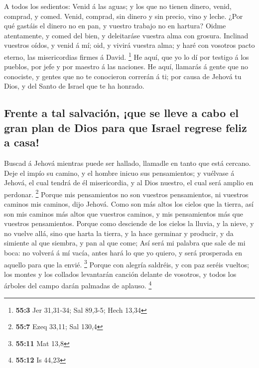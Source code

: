  A todos los sedientos: Venid á las aguas; y los que no
tienen dinero, venid, comprad, y comed. Venid, comprad, sin dinero y sin
precio, vino y leche.  ¿Por qué gastáis el dinero no en pan,
y vuestro trabajo no en hartura? Oidme atentamente, y comed del bien, y
deleitaráse vuestra alma con grosura.  Inclinad vuestros
oídos, y venid á mí; oid, y vivirá vuestra alma; y haré con vosotros
pacto eterno, las misericordias firmes á David. \footnote{\textbf{55:3}
  Jer 31,31-34; Sal 89,3-5; Hech 13,34}  He aquí, que yo lo
dí por testigo á los pueblos, por jefe y por maestro á las naciones.
 He aquí, llamarás á gente que no conociste, y gentes que no
te conocieron correrán á ti; por causa de Jehová tu Dios, y del Santo de
Israel que te ha honrado.

\hypertarget{frente-a-tal-salvaciuxf3n-que-se-lleve-a-cabo-el-gran-plan-de-dios-para-que-israel-regrese-feliz-a-casa}{%
\subsection{Frente a tal salvación, ¡que se lleve a cabo el gran plan de
Dios para que Israel regrese feliz a
casa!}\label{frente-a-tal-salvaciuxf3n-que-se-lleve-a-cabo-el-gran-plan-de-dios-para-que-israel-regrese-feliz-a-casa}}

 Buscad á Jehová mientras puede ser hallado, llamadle en
tanto que está cercano.  Deje el impío su camino, y el
hombre inicuo sus pensamientos; y vuélvase á Jehová, el cual tendrá de
él misericordia, y al Dios nuestro, el cual será amplio en perdonar.
\footnote{\textbf{55:7} Ezeq 33,11; Sal 130,4}  Porque mis
pensamientos no son vuestros pensamientos, ni vuestros caminos mis
caminos, dijo Jehová.  Como son más altos los cielos que la
tierra, así son mis caminos más altos que vuestros caminos, y mis
pensamientos más que vuestros pensamientos.  Porque como
desciende de los cielos la lluvia, y la nieve, y no vuelve allá, sino
que harta la tierra, y la hace germinar y producir, y da simiente al que
siembra, y pan al que come;  Así será mi palabra que sale
de mi boca: no volverá á mí vacía, antes hará lo que yo quiero, y será
prosperada en aquello para que la envié. \footnote{\textbf{55:11} Mat
  13,8}  Porque con alegría saldréis, y con paz seréis
vueltos; los montes y los collados levantarán canción delante de
vosotros, y todos los árboles del campo darán palmadas de aplauso.
\footnote{\textbf{55:12} Is 44,23}

